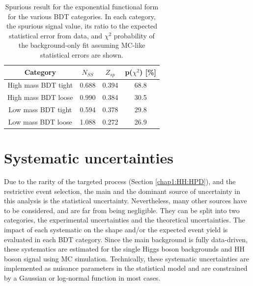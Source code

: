 \begin{table}[]
    \centering
    \begin{tabular}{cccc}
    \hline\hline
       Category  & $N_{SS}$ & $Z_{sp}$ & p($\chi^2$) [\%] \\
       \hline
       High mass BDT tight &  0.688 & 0.394 & 68.8 \\
       High mass BDT loose &  0.990 & 0.384 & 30.5 \\
       Low mass BDT tight  &  0.594 & 0.378 & 29.8 \\
       Low mass BDT loose  & 1.088  & 0.272 & 26.9 \\
       \hline\hline
    \end{tabular}
    \caption{Spurious result for the exponential functional form for the various BDT categories. In each category, the spurious signal value, its ratio to the expected statistical error from data, and $\chi^2$ probability of the background-only fit assuming MC-like statistical errors are shown.}
    \label{tab:HHyybb:Modelling:Bkg:SS}
\end{table}

\section{Systematic uncertainties}
\label{HHyybb:Syst}
Due to the rarity of the targeted process (Section \ref{chap1:HH:HPD}), and the restrictive event selection, the main and the dominant source of uncertainty in this analysis is the statistical uncertainty. Nevertheless, many other sources have to be considered, and are far from being negligible. They can be split into two categories, the experimental uncertainties and the theoretical uncertainties. The impact of each systematic on the shape and/or the expected event yield is evaluated in each BDT category. Since the main background is fully data-driven, these systematics are estimated for the single Higgs boson backgrounds and HH boson signal using MC simulation. Technically, these systematic uncertainties are implemented as nuisance parameters in the statistical model and are constrained by a Gaussian or log-normal function in most cases. 
